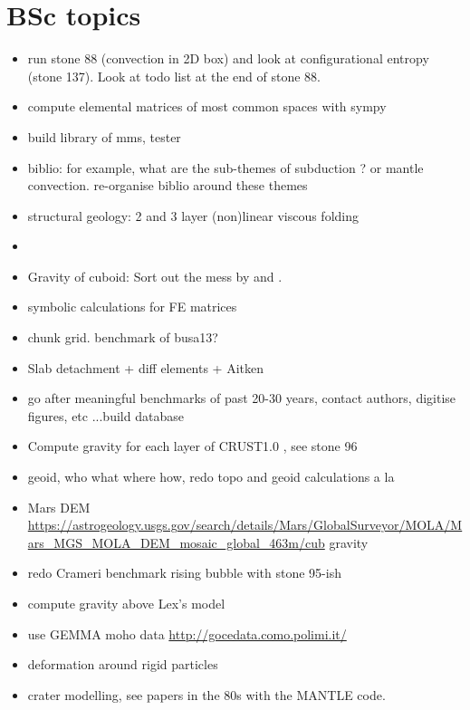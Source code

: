 \documentclass[a4paper]{article}
\begin{document}
\newpage
\section{BSc topics}

\begin{itemize}
\item run stone 88 (convection in 2D box) and look at configurational entropy 
(stone 137). Look at todo list at the end of stone 88.
\item compute elemental matrices of most common spaces with sympy
\item build library of mms, tester
\item biblio: for example, what are the sub-themes of subduction ? 
or mantle convection. re-organise biblio around these themes
\item structural geology: 2 and 3 layer (non)linear viscous folding
\item {}
\item Gravity of cuboid: Sort out the mess by \textcite{duti16} and \textcite{zhhu17}.
\item symbolic calculations for FE matrices
\item chunk grid. benchmark of busa13?
\item Slab detachment + diff elements + Aitken
\item go after meaningful benchmarks of past 20-30 years, contact authors, digitise figures, etc ...build database
\item Compute gravity for each layer of CRUST1.0 , see stone 96
\item geoid, who what where how, redo topo and geoid calculations a la \cite{king09}
\item Mars DEM \url{https://astrogeology.usgs.gov/search/details/Mars/GlobalSurveyor/MOLA/Mars_MGS_MOLA_DEM_mosaic_global_463m/cub} gravity
\item redo Crameri benchmark rising bubble with stone 95-ish
\item compute gravity above Lex's model \cite{furc15}
\item use GEMMA moho data \url{http://gocedata.como.polimi.it/} \cite{resa15} 
\item deformation around rigid particles \cite{ilma93}
\item crater modelling, see papers in the 80s with the MANTLE code.
\end{itemize}
\end{document}
